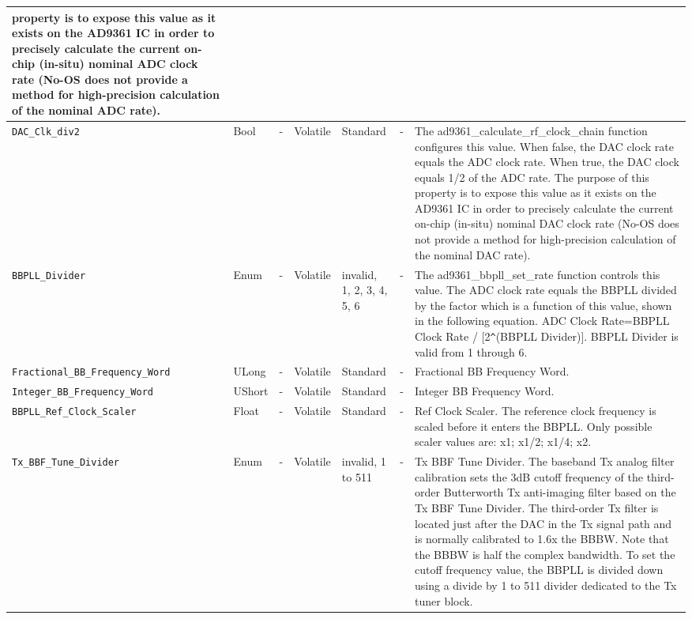 \documentclass{article}
\begin{document}
\begin{landscape}
\begin{scriptsize}
\begin{longtable}{|p{3.6cm}|p{8.1cm}|p{1.4cm}|p{1.3cm}|p{1.4cm}|p{2.5cm}|p{3.6cm}|}
                                 property is to expose this value as it exists
                                 on the AD9361 IC in order to precisely
                                 calculate the current on-chip (in-situ) nominal
                                 ADC clock rate (No-OS does not provide a method
                                 for high-precision calculation of the nominal
                                 ADC rate). \\
			\hline
			\verb+DAC_Clk_div2+ & Bool & - & Volatile & Standard & - &
                                The ad9361\_calculate\_rf\_clock\_chain
                                  function configures this value. When false,
                                  the DAC clock rate equals the ADC clock rate.
                                  When true, the DAC clock equals 1/2 of the ADC
                                  rate. The purpose of this property is to
                                  expose this value as it exists on the AD9361
                                  IC in order to precisely calculate the current
                                  on-chip (in-situ) nominal DAC clock rate
                                  (No-OS does not provide a method for
                                  high-precision calculation of the nominal DAC
                                  rate). \\
			\hline
			\verb+BBPLL_Divider+ & Enum & - & Volatile & invalid, 1, 2, 3, 4, 5, 6 & - & The ad9361\_bbpll\_set\_rate function controls this value. The ADC clock rate equals the BBPLL divided by the factor which is a function of this value, shown in the following equation. ADC Clock Rate=BBPLL Clock Rate / [2\texttt{\^}(BBPLL Divider)]. BBPLL Divider is valid from 1 through 6. \\
			\hline
			\verb+Fractional_BB_Frequency_Word+ & ULong & - & Volatile & Standard & - & Fractional BB Frequency Word. \\
			\hline
			\verb+Integer_BB_Frequency_Word+ & UShort & - & Volatile & Standard & - & Integer BB Frequency Word. \\
			\hline
			\verb+BBPLL_Ref_Clock_Scaler+ & Float & - & Volatile & Standard & - & Ref Clock Scaler. The reference clock frequency is scaled before it enters the BBPLL. Only possible scaler values are: x1; x1/2; x1/4; x2. \\
			\hline
			\verb+Tx_BBF_Tune_Divider+ & Enum & - & Volatile & invalid, 1 to 511 & - & Tx BBF Tune Divider. The baseband Tx analog filter calibration sets the 3dB cutoff frequency of the third-order Butterworth Tx anti-imaging filter based on the Tx BBF Tune Divider. The third-order Tx filter is located just after the DAC in the Tx signal path and is normally calibrated to 1.6x the BBBW. Note that the BBBW is half the complex bandwidth. To set the cutoff frequency value, the BBPLL is divided down using a divide by 1 to 511 divider dedicated to the Tx tuner block. \\

\end{longtable}
\end{scriptsize}
\end{landscape}
\end{document}
